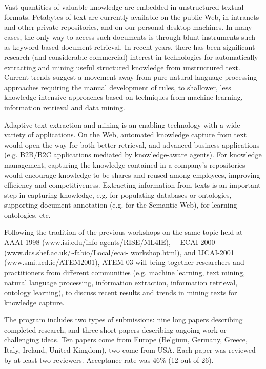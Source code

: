 \documentclass[12pt,a4paper]{article}
\begin{document}
\begin{small}

\noindent Vast quantities of valuable knowledge are embedded in
unstructured textual formats. Peta\-bytes of text are currently
available on the public Web, in intranets and other private
repositories, and on our personal desktop machines. In many cases, the
only way to access such documents is through blunt instruments such as
keyword-based document retrieval. In recent years, there has been
significant research (and considerable commercial) interest in
technologies for automatically extracting and mining useful structured
knowledge from unstructured text. Current trends suggest a movement
away from pure natural language processing approaches requiring the
manual development of rules, to shallower, less knowledge-intensive
approaches based on techniques from machine learning, information
retrieval and data mining.

Adaptive text extraction and mining is an enabling technology with a
wide variety of applications. On the Web, automated knowledge capture
from text would open the way for both better retrieval, and advanced
business applications (e.g. B2B/B2C applications mediated by
knowledge-aware agents). For knowledge management, capturing the
knowledge contained in a company's repositories would encourage
knowledge to be shares and reused among employees, improving
efficiency and competitiveness. Extracting information from texts is
an important step in capturing knowledge, e.g. for populating
databases or ontologies, supporting document annotation (e.g. for the
Semantic Web), for learning ontologies, etc.

Following the tradition of the previous workshops on the same topic
held at AAAI-1998 (www.isi.edu/info-agents/RISE/ML4IE), \ \ ECAI-2000
(www.dcs.shef.ac.uk/\verb|~|fabio/Local/\-ecai- work\-shop.\-html), and
IJCAI-2001 (www.smi.ucd.ie/ATEM2001), ATEM-03 will bring together
researchers and practitioners from different communities (e.g. machine
learning, text mining, natural language processing, information
extraction, information retrieval, ontology learning), to discuss
recent results and trends in mining texts for knowledge capture.

The program includes two types of submissions: nine long papers
describing completed research, and three short papers describing
ongoing work or challenging ideas. Ten papers come from Europe
(Belgium, Germany, Greece, Italy, Ireland, United Kingdom), two come
from USA.  Each paper was reviewed by at least two
reviewers. Acceptance rate was 46\% (12 out of 26).


\end{small}
\end{document}
